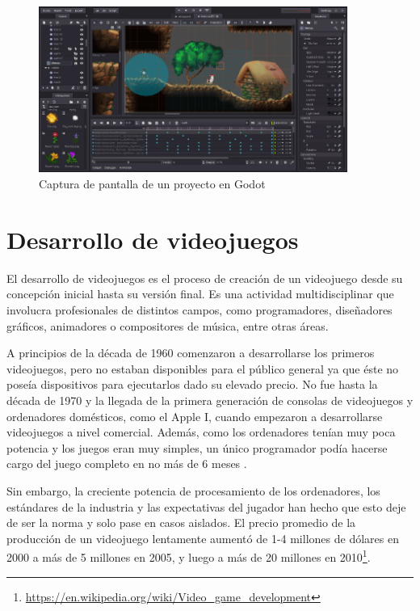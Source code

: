 \begin{figure}[!h]
\begin{center}
\includegraphics[width=0.9\textwidth]{imagenes/2/godot.jpg}
\caption{Captura de pantalla de un proyecto en Godot}
\label{fig:godot}
\end{center}
\end{figure}

\section{Desarrollo de videojuegos}

El desarrollo de videojuegos es el proceso de creación de un videojuego desde su concepción inicial hasta su versión final. Es una actividad multidisciplinar que involucra profesionales de distintos campos, como programadores, diseñadores gráficos, animadores o compositores de música, entre otras áreas.

A principios de la década de 1960 comenzaron a desarrollarse los primeros videojuegos, pero no estaban disponibles para el público general ya que éste no poseía dispositivos para ejecutarlos dado su elevado precio. No fue hasta la década de 1970 y la llegada de la primera generación de consolas de videojuegos y ordenadores domésticos, como el Apple I, cuando empezaron a desarrollarse videojuegos a nivel comercial. Además, como los ordenadores tenían muy poca potencia y los juegos eran muy simples, un único programador podía hacerse cargo del juego completo en no más de 6 meses \cite{next-gen-97}.

Sin embargo, la creciente potencia de procesamiento de los ordenadores, los estándares de la industria y las expectativas del jugador han hecho que esto deje de ser la norma y solo pase en casos aislados. El precio promedio de la producción de un videojuego lentamente aumentó de 1-4 millones de dólares en 2000 a más de 5 millones en 2005, y luego a más de 20 millones en 2010\footnote{\url{https://en.wikipedia.org/wiki/Video_game_development}}.

